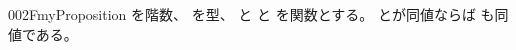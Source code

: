 \documentclass[index]{subfiles}
\begin{document}
\begin{myBlock}{002F}{myProposition}
  を階数、
  を型、
  と
  と
  を関数とする。
  とが同値ならば
  も同値である。
\end{myBlock}
\end{document}
